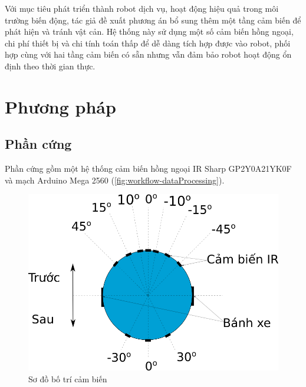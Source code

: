 Với mục tiêu phát triển thành robot dịch vụ, hoạt động hiệu quả trong môi trường biến động, tác giả đề xuất phương án bổ sung thêm một tầng cảm biến để phát hiện và tránh vật cản. Hệ thống này sử dụng một số cảm biến hồng ngoại, chi phí thiết bị và chi tính toán thấp để dễ dàng tích hợp được vào robot, phối hợp cùng với hai tầng cảm biến có sẵn nhưng vẫn đảm bảo robot hoạt động ổn định theo thời gian thực. 

\section{Phương pháp}


\subsection{Phần cứng}


Phần cứng gồm một hệ thống cảm biến hồng ngoại IR Sharp GP2Y0A21YK0F và mạch Arduino Mega 2560 (\figurename{\ref{fig:workflow-dataProcessing}}).

\begin{figure}[htbp]
	\centering
	\includegraphics[width=0.7\linewidth]{figures/IR_layout.png}
	\caption{Sơ đồ bố trí cảm biến}
	\label{fig:IR_layout.png}
\end{figure}


